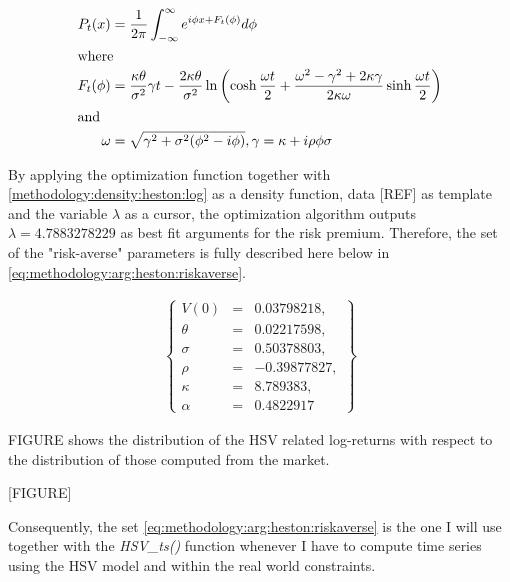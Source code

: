 \documentclass[12pt]{report}
\begin{document}
\begin{align}
P_t(x) &= \frac{1}{2 \pi} \int_{-\infty}^{\infty} e^{i \phi x + F_t(\phi)} d\phi \label{methodology:density:heston:log} \\
\intertext{where}
F_t(\phi) &= \frac{\kappa \theta}{\sigma^2} \gamma t -
  \frac{2 \kappa \theta}{\sigma ^2} \ln\left(
    \cosh \frac{\omega t}{2} +
    \frac{\omega^2 - \gamma^2 +2 \kappa \gamma}{2 \kappa \omega} \sinh \frac{\omega t}{2}
  \right) \notag \\
\intertext{and}
\omega &= \sqrt{\gamma^2 + \sigma^2 (\phi^2 - i\phi)}, \notag
\gamma = \kappa + i \rho \phi \sigma \notag
\end{align}

By applying the optimization function together with \cref{methodology:density:heston:log} as a density function, data [REF] as template and the variable $\lambda$ as a cursor, the optimization algorithm outputs $\lambda = 4.7883278229$ as best fit arguments for the risk premium.
Therefore, the set of the "risk-averse" parameters is fully described here below in \ref{eq:methodology:arg:heston:riskaverse}.

\begin{align}
  \left \{
  \begin{array}{lcl}
    V(0) &= &0.03798218, \\
    \theta &= &0.02217598, \\
    \sigma &= &0.50378803, \\
    \rho &= &-0.39877827, \\
    \kappa &= &8.789383, \\
    \alpha & = &0.4822917
  \end{array}
  \right \}  
  \label{eq:methodology:arg:heston:riskaverse}
\end{align}

FIGURE shows the distribution of the HSV related log-returns with respect to the distribution of those computed from the market.

[FIGURE]

Consequently, the set \ref{eq:methodology:arg:heston:riskaverse} is the one I will use together with the \textit{HSV\_ts()} function whenever I have to compute time series using the HSV model and within the real world constraints.





























\end{document}
